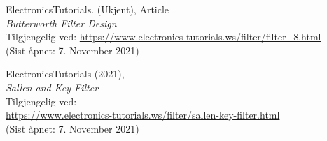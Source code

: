 \documentclass[a4paper,11pt,norsk]{article}
\begin{document}
\begin{thebibliography}{9}
    ElectronicsTutorials. (Ukjent), Article \\
    \emph{Butterworth Filter Design} \\
    Tilgjengelig ved: \href{https://www.electronics-tutorials.ws/filter/filter_8.html}{https://www.electronics-tutorials.ws/filter/filter_8.html} \\
    (Sist åpnet: 7. November 2021)

    ElectronicsTutorials (2021),  \\
    \emph{Sallen and Key Filter} \\
    Tilgjengelig ved: \\
    \href{https://www.electronics-tutorials.ws/filter/sallen-key-filter.html}{https://www.electronics-tutorials.ws/filter/sallen-key-filter.html} \\
    (Sist åpnet: 7. November 2021) 
\end{thebibliography}
\newpage

\appendix
\end{document}

